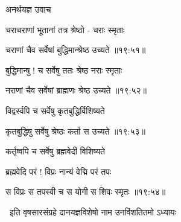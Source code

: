 {\devanagarifont अनर्थयज्ञ उवाच {\dandab}\dontdisplaylinenum  }%
 
{\devanagarifont चराचराणां भूतानां तत्र श्रेष्ठो - चराः स्मृताः \thinspace{\danda} \dontdisplaylinenum }%
 

{\devanagarifont चराणां चैव सर्वेषां बुद्धिमान्श्रेष्ठ उच्यते {॥१९:५१॥} \veg\dontdisplaylinenum }%
 
{\devanagarifont बुद्धिमान्षु ! च सर्वेषु ततः श्रेष्ठ नराः स्मृताः \thinspace{\dandab} \dontdisplaylinenum }%
 

{\devanagarifont नराणां चैव सर्वेषां ब्राह्मणः श्रेष्ठ उच्यते {॥१९:५२॥} \veg\dontdisplaylinenum }%
 
{\devanagarifont विद्वर्स्वपि च सर्वेषु कृतबुद्धिर्विशिष्यते \thinspace{\dandab} \dontdisplaylinenum }%
 

{\devanagarifont कृतबुद्धिषु सर्वेषु श्रेष्ठः कर्ता स उच्यते {॥१९:५३॥} \veg\dontdisplaylinenum }%
 
{\devanagarifont कर्तृष्वपि च सर्वेषु ब्रह्मवेदी विशिष्यते \thinspace{\dandab} \dontdisplaylinenum }%
 
{\devanagarifont ब्रह्मवेदि परं ! विप्रः नान्यं वेद्मि परं तपः  \danda\dontdisplaylinenum }%
 

{\devanagarifont स विप्रः स तपस्वी च स योगी स शिवः स्मृतः {॥१९:५४॥} \veg\dontdisplaylinenum }%
 
{\devanagarifont 
\jump
\begin{center}
\ketdanda\ इति वृषसारसंग्रहे दानयज्ञविशेषो नाम उनविंशतितमो ऽध्यायः \ketdanda
\end{center}
\dontdisplaylinenum\vers  }%
 